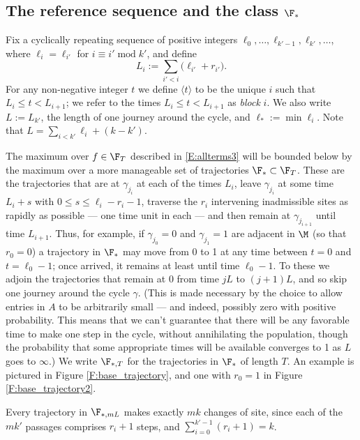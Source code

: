 \documentclass[11pt]{amsart}
\begin{document}
\subsection{The reference sequence and the class $\F_*$}
Fix a cyclically repeating sequence of positive integers $\ell_0,\dots,\ell_{k'-1},\ell_{k'},\dots$, where $\ell_i=\ell_{i'}$ for $i\equiv i' \operatorname{mod} k'$, and define
$$
L_i:= \sum_{i'< i} \bigl(\ell_{i'}+r_{i'}\bigr).
$$
For any non-negative integer $t$ we define $\langle t\rangle$ to be the unique $i$ such that $L_i\le t < L_{i+1}$;
we refer to the times $L_i\le t<L_{i+1}$ as {\em block} $i$.
We also write $L:= L_{k'}$, the length of one journey around the cycle, and $\ell_*:= \min\ell_i$.
Note that $L=\sum_{i<k'}\ell_i + (k-k')$.

The maximum over $f\in \F_T$ described in \eqref{E:allterms3}
will be bounded below by the maximum over a more manageable set of trajectories $\F_*\subset \F_T$.
These are the trajectories that are at $\gamma_{j_i}$ at each of the times $L_i$, leave
$\gamma_{j_i}$ at some time $L_i+s$ with $0\le s\le \ell_i-r_i-1$, traverse the $r_i$
intervening inadmissible sites as rapidly as possible --- one time unit in each ---
and then remain at $\gamma_{j_{i+1}}$ until time $L_{i+1}$.
Thus, for example, if $\gamma_{j_0}=0$ and $\gamma_{j_1}=1$ are adjacent in $\M$ (so that $r_0=0$)
a trajectory in $\F_*$ may move from 0 to 1 at any time
between $t=0$ and $t=\ell_0-1$; once arrived, it remains
at least until time $\ell_0-1$.
To these we adjoin the trajectories that remain at 0 from time $jL$ to $(j+1)L$, and so skip one journey around the cycle $\gamma$.
(This is made necessary by the choice to allow entries in $A$ to be arbitrarily small --- and indeed, possibly zero with positive probability.
This means that we can't guarantee that there will be any favorable time to make one step in the cycle, without annihilating the population, though the probability that some appropriate times will be available converges to 1 as $L$ goes to $\infty$.)
We write $\F_{*,T}$ for
the trajectories in $\F_*$ of length $T$. An example is pictured in Figure \ref{F:base_trajectory}, and one with $r_0=1$ in Figure \ref{F:base_trajectory2}.

Every trajectory in $\F_{*,mL}$ makes exactly $mk$ changes of site, since each of the $mk'$ passages
comprises $r_i+1$ steps, and $\sum_{i=0}^{k'-1}(r_i+1)=k$.
\end{document}
